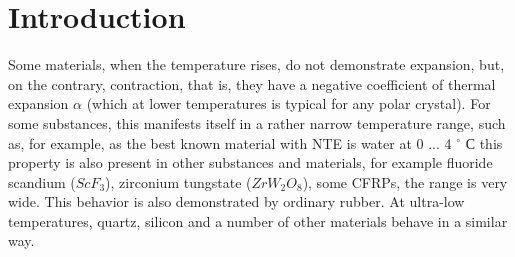 \documentclass[10pt, a4paper, twocolumn]{article}
\begin{document}
  
    
   
 \clearpage
\section{Introduction}

Some materials, when the temperature rises, do not demonstrate expansion, but, on the contrary, contraction, that is, they have a negative coefficient of thermal expansion $ \alpha $ (which at lower temperatures is typical for any polar crystal). For some substances, this manifests itself in a rather narrow temperature range, such as, for example, as the best known material with NTE is water at 0 ... 4 $^{\circ} $ С this property is also present in other substances and materials, for example fluoride scandium ($ ScF_3 $), zirconium tungstate ($ZrW_2O_8$), some CFRPs, the range is very wide. This behavior is also demonstrated by ordinary rubber. At ultra-low temperatures, quartz, silicon and a number of other materials behave in a similar way.


\end{document}
